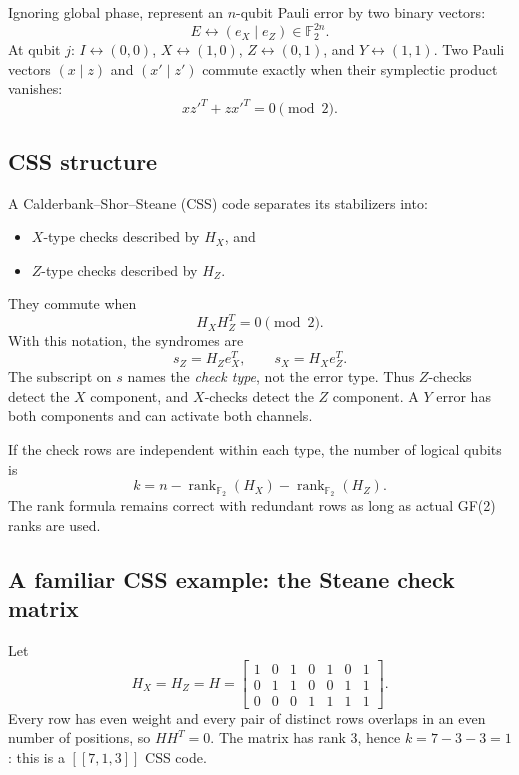 \documentclass[11pt]{article}
\newcommand{\Ftwo}{\mathbb{F}_2}
\newcommand{\rank}{\operatorname{rank}}
\begin{document}
Ignoring global phase, represent an \(n\)-qubit Pauli error by two binary vectors:
\[
E\longleftrightarrow(e_X\mid e_Z)\in\Ftwo^{2n}.
\]
At qubit \(j\): \(I\leftrightarrow(0,0)\), \(X\leftrightarrow(1,0)\),
\(Z\leftrightarrow(0,1)\), and \(Y\leftrightarrow(1,1)\). Two Pauli vectors
\((x\mid z)\) and \((x'\mid z')\) commute exactly when their symplectic product vanishes:
\[
xz'^T+zx'^T=0\pmod2.
\]

\subsection{CSS structure}

A Calderbank--Shor--Steane (CSS) code separates its stabilizers into:
\begin{itemize}
  \item \(X\)-type checks described by \(H_X\), and
  \item \(Z\)-type checks described by \(H_Z\).
\end{itemize}
They commute when
\[
\boxed{H_XH_Z^T=0\pmod2.}
\]
With this notation, the syndromes are
\[
\boxed{s_Z=H_Ze_X^T},\qquad
\boxed{s_X=H_Xe_Z^T}.
\]
The subscript on \(s\) names the \emph{check type}, not the error type. Thus \(Z\)-checks detect
the \(X\) component, and \(X\)-checks detect the \(Z\) component. A \(Y\) error has both components
and can activate both channels.

If the check rows are independent within each type, the number of logical qubits is
\[
k=n-\rank_{\Ftwo}(H_X)-\rank_{\Ftwo}(H_Z).
\]
The rank formula remains correct with redundant rows as long as actual GF(2) ranks are used.

\subsection{A familiar CSS example: the Steane check matrix}

Let
\[
H_X=H_Z=H=
\begin{bmatrix}
1&0&1&0&1&0&1\\
0&1&1&0&0&1&1\\
0&0&0&1&1&1&1
\end{bmatrix}.
\]
Every row has even weight and every pair of distinct rows overlaps in an even number of positions,
so \(HH^T=0\). The matrix has rank 3, hence \(k=7-3-3=1\): this is a \([[7,1,3]]\) CSS code.
\end{document}
